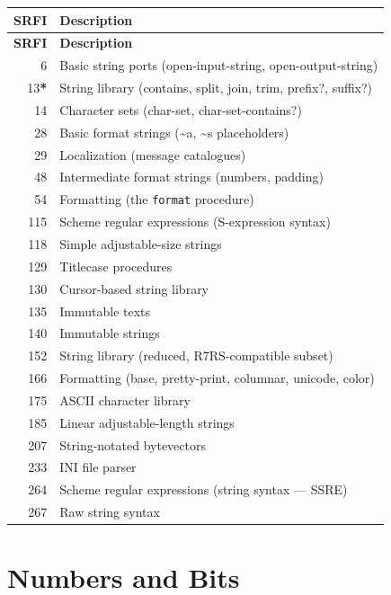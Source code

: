 \begin{longtable}{rp{9cm}}
\textbf{SRFI} & \textbf{Description} \\
\hline
\endfirsthead
\textbf{SRFI} & \textbf{Description} \\
\hline
\endhead
6 & Basic string ports (open-input-string, open-output-string) \\
13\textbf{*} & String library (contains, split, join, trim, prefix?, suffix?) \\
14 & Character sets (char-set, char-set-contains?) \\
28 & Basic format strings (\textasciitilde a, \textasciitilde s placeholders) \\
29 & Localization (message catalogues) \\
48 & Intermediate format strings (numbers, padding) \\
54 & Formatting (the \texttt{format} procedure) \\
115 & Scheme regular expressions (S-expression syntax) \\
118 & Simple adjustable-size strings \\
129 & Titlecase procedures \\
130 & Cursor-based string library \\
135 & Immutable texts \\
140 & Immutable strings \\
152 & String library (reduced, R7RS-compatible subset) \\
166 & Formatting (base, pretty-print, columnar, unicode, color) \\
175 & ASCII character library \\
185 & Linear adjustable-length strings \\
207 & String-notated bytevectors \\
233 & INI file parser \\
264 & Scheme regular expressions (string syntax --- SSRE) \\
267 & Raw string syntax \\
\end{longtable}

\section{Numbers and Bits}

